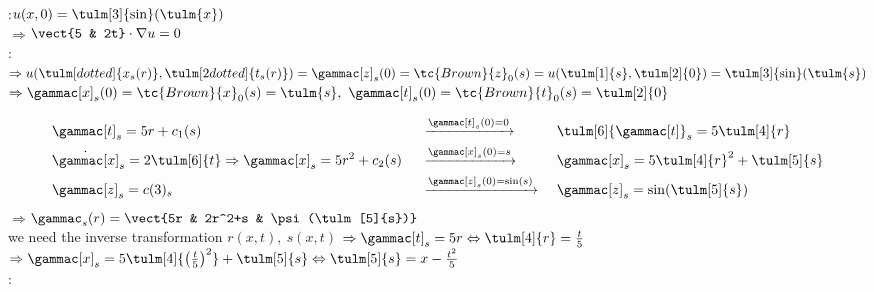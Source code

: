 \begin{notebox}[Example 3: \textnormal{$5u_t+2tu_x=0$\hfil $\dot{t}=5,\ \dot{x}=2t,\ \dot{z}=0$}]
                :\hfil $u(x, 0)=\tulm[3]{\sin}(\tulm{x})$\\
                $\Rightarrow$\hfil $\vect{5 & 2t}\cdot\nabla u=0$\\
                :\\
                $\Rightarrow u(\tulm[dotted]{x_s(r)},\tulm[2dotted]{t_s(r)})=\gammac[z]_s(0)=\tc{Brown}{z}_0(s)=u(\tulm[1]{s},\tulm[2]{0})=\tulm[3]{\sin}(\tulm{s})$\\
                $\Rightarrow \gammac[x]_s(0)=\tc{Brown}{x}_0(s)=\tulm{s},\
                             \gammac[t]_s(0)=\tc{Brown}{t}_0(s)=\tulm[2]{0}$
\end{notebox}
\begin{notebox}[Solution 3]
                \nospacing
                \begin{alignat*}{3}
                    &\gammac[t]_s=5r+c_1(s)                  &  &\xrightarrow{\gammac[t]_s(0)=0} &   & \tulm[6]{\gammac[t]}_s=5\tulm[4]{r}\\
&\dot{\gammac[x]}_s=2\tulm[6]{t}\Rightarrow\gammac[x]_s=5r^2+c_2(s)&    &\xrightarrow{\gammac[x]_s(0)=s}  &  & \gammac[x]_s=5\tulm[4]{r}^2+\tulm[5]{s}      \\
                    &\gammac[z]_s=c(3)_s                 &\     &\xrightarrow{\gammac[z]_s(0)=\sin(s)}&\ & \gammac[z]_s=\sin(\tulm[5]{s})
                \end{alignat*}
                $\Rightarrow$\hfil$ \gammac_s(r)=\vect{5r & 2r^2+s & \psi(\tulm[5]{s})}$\\
                \imp{Now} we need the inverse transformation $r(x,t),\ s(x,t)$
                $\Rightarrow \gammac[t]_s=5r \Leftrightarrow \tulm[4]{r}=\frac{t}{5}$\qquad
                    $\Rightarrow  \gammac[x]_s=5\tulm[4]{\left(\frac{t}{5}\right)^2}+\tulm[5]{s} \Leftrightarrow
                    \tulm[5]{s}=x-\frac{t^2}{5}$\\
                : 
\end{notebox}
